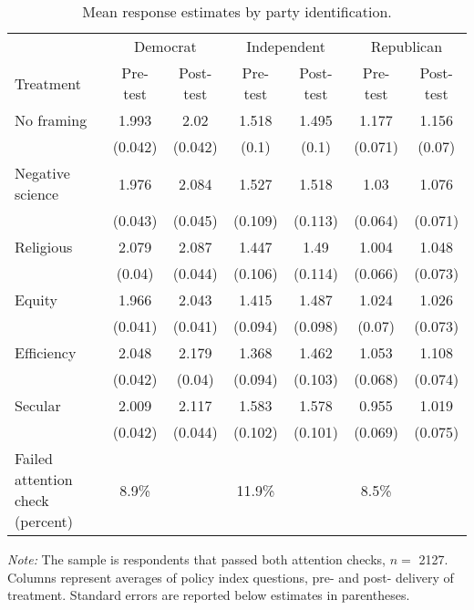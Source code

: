 \begin{table*}

\caption{\label{tab:unnamed-chunk-21}Mean response estimates by party identification. \label{tab:party_means_passed}}
\centering
\begin{threeparttable}
\begin{tabular}[t]{lcccccc}
\toprule
\multicolumn{1}{c}{ } & \multicolumn{2}{c}{Democrat} & \multicolumn{2}{c}{Independent} & \multicolumn{2}{c}{Republican} \\
Treatment & Pre-test & Post-test & Pre-test & Post-test & Pre-test & Post-test\\
\cmidrule(lr){2-3} \cmidrule(lr){4-5} \cmidrule(lr){6-7}
No framing & \num{1.993} & \num{2.02} & \num{1.518} & \num{1.495} & \num{1.177} & \num{1.156}\\
 & (\num{0.042}) & (\num{0.042}) & (\num{0.1}) & (\num{0.1}) & (\num{0.071}) & (\num{0.07})\\
\addlinespace
Negative science & \num{1.976} & \num{2.084} & \num{1.527} & \num{1.518} & \num{1.03} & \num{1.076}\\
 & (\num{0.043}) & (\num{0.045}) & (\num{0.109}) & (\num{0.113}) & (\num{0.064}) & (\num{0.071})\\
\addlinespace
Religious & \num{2.079} & \num{2.087} & \num{1.447} & \num{1.49} & \num{1.004} & \num{1.048}\\
 & (\num{0.04}) & (\num{0.044}) & (\num{0.106}) & (\num{0.114}) & (\num{0.066}) & (\num{0.073})\\
\addlinespace
Equity & \num{1.966} & \num{2.043} & \num{1.415} & \num{1.487} & \num{1.024} & \num{1.026}\\
 & (\num{0.041}) & (\num{0.041}) & (\num{0.094}) & (\num{0.098}) & (\num{0.07}) & (\num{0.073})\\
\addlinespace
Efficiency & \num{2.048} & \num{2.179} & \num{1.368} & \num{1.462} & \num{1.053} & \num{1.108}\\
 & (\num{0.042}) & (\num{0.04}) & (\num{0.094}) & (\num{0.103}) & (\num{0.068}) & (\num{0.074})\\
\addlinespace
Secular & \num{2.009} & \num{2.117} & \num{1.583} & \num{1.578} & \num{0.955} & \num{1.019}\\
 & (\num{0.042}) & (\num{0.044}) & (\num{0.102}) & (\num{0.101}) & (\num{0.069}) & (\num{0.075})\\
\addlinespace
Failed attention check (percent) & \num{8.9}\% &  & \num{11.9}\% &  & \num{8.5}\% & \\
\bottomrule
\end{tabular}
\begin{tablenotes}
\item \footnotesize \textit{Note:} The sample is respondents that passed both attention checks, $n = $ \num{2127}. Columns represent averages of policy index questions, pre- and post- delivery of treatment. Standard errors are reported below estimates in parentheses.
\end{tablenotes}
\end{threeparttable}
\end{table*}
